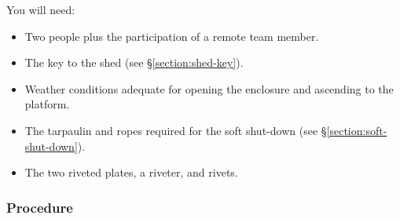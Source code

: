You will need:

\begin{itemize}
    \item Two people plus the participation of a remote team member.
    \item The key to the shed (see \S\ref{section:shed-key}).
    \item Weather conditions adequate for opening the enclosure and ascending to the platform.
    \item The tarpaulin and ropes required for the soft shut-down (see \S\ref{section:soft-shut-down}).
    \item The two riveted plates, a riveter, and rivets.
\end{itemize}

\subsubsection{Procedure}

